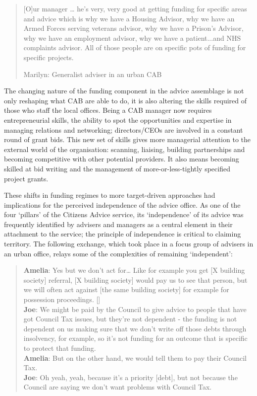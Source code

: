     \blockquote[Marilyn: Generalist adviser in an urban CAB]{[O]ur manager … he’s very, very good at getting funding for specific areas and advice which is why we have a Housing Advisor, why we have an Armed Forces serving veterans advisor, why we have a Prison’s Advisor, why we have an employment advisor, why we have a patient...and NHS complaints advisor. All of those people are on specific pots of funding for specific projects.}
The changing nature of the funding component in the advice assemblage is not only reshaping what CAB are able to do, it is also altering the skills required of those who staff the local offices. Being a CAB manager now requires entrepreneurial skills, the ability to spot the opportunities and expertise in managing relations and networking; directors/CEOs are involved in a constant round of grant bids. This new set of skills gives more managerial attention to the external world of the organisation: scanning, liaising, building partnerships and becoming competitive with other potential providers. It also means becoming skilled at bid writing and the management of more-or-less-tightly specified project grants.
\par
These shifts in funding regimes to more target-driven approaches had implications for the perceived independence of the advice office. As one of the four ‘pillars’%
of the Citizens Advice service, its ‘independence’ of its advice was frequently identified by advisers and managers as a central element in their attachment to the service; the principle of independence is critical to claiming territory. The following exchange, which took place in a focus group of advisers in an urban office, relays some of the complexities of remaining ‘independent’:
    \blockquote{\textnormal{\bfseries Amelia}: Yes but we don’t act for… Like for example you get [X building society] referral, [X building society] would pay us to see that person, but we will often act against [the same building society] for example for possession proceedings. [\textellipsis]
    \\\textnormal{\bfseries Joe}: We might be paid by the Council to give advice to people that have got Council Tax issues, but they’re not dependent - the funding is not dependent on us making sure that we don’t write off those debts through insolvency, for example, so it’s not funding for an outcome that is specific to protect that funding. 
    \\\textnormal{\bfseries Amelia}: But on the other hand, we would tell them to pay their Council Tax. 
    \\\textnormal{\bfseries Joe}: Oh yeah, yeah, because it’s a priority [debt], but not because the Council are saying we don’t want problems with Council Tax.}
